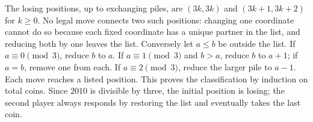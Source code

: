 The losing positions, up to exchanging piles, are $(3k,3k)$ and $(3k+1,3k+2)$ for $k\ge0$. No legal move connects two such positions: changing one coordinate cannot do so because each fixed coordinate has a unique partner in the list, and reducing both by one leaves the list. Conversely let $a\le b$ be outside the list. If $a\equiv0\pmod3$, reduce $b$ to $a$. If $a\equiv1\pmod3$ and $b>a$, reduce $b$ to $a+1$; if $a=b$, remove one from each. If $a\equiv2\pmod3$, reduce the larger pile to $a-1$. Each move reaches a listed position. This proves the classification by induction on total coins. Since $2010$ is divisible by three, the initial position is losing; the second player always responds by restoring the list and eventually takes the last coin.

